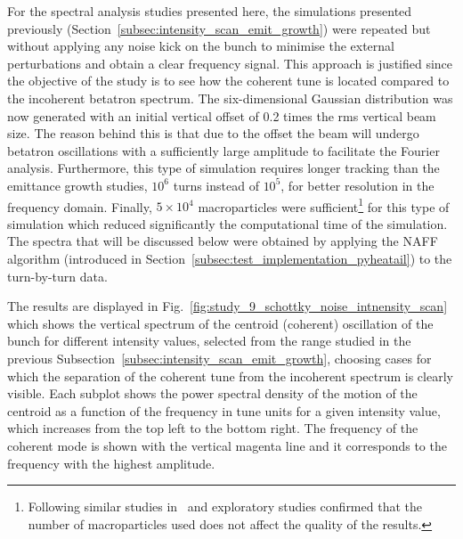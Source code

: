 For the spectral analysis studies presented here, the simulations presented previously (Section~\ref{subsec:intensity_scan_emit_growth}) were repeated but without applying any noise kick on the bunch to minimise the external perturbations and obtain a clear frequency signal. This approach is justified since the objective of the study is to see how the coherent tune is located compared to the incoherent betatron spectrum. The six-dimensional Gaussian distribution was now generated with an initial vertical offset of 0.2 times the rms vertical beam size. The reason behind this is that due to the offset the beam will undergo betatron oscillations with a sufficiently large amplitude to facilitate the Fourier analysis. Furthermore, this type of simulation requires longer tracking than the emittance growth studies, $10^6$ turns instead of $10^5$, for better resolution in the frequency domain. Finally, $5 \times 10^4$ macroparticles were sufficient\footnote{Following similar studies in~\cite{Zorzano-Mier:446334} and exploratory studies confirmed that the number of macroparticles used does not affect the quality of the results.} for this type of simulation which reduced significantly the computational time of the simulation. The spectra that will be discussed below were obtained by applying the NAFF algorithm (introduced in Section~\ref{subsec:test_implementation_pyheatail}) to the turn-by-turn data.%

The results are displayed in Fig.~\ref{fig:study_9_schottky_noise_intnensity_scan} which shows the vertical spectrum of the centroid (coherent) oscillation of the bunch for different intensity values, selected from the range studied in the previous Subsection~\ref{subsec:intensity_scan_emit_growth}, choosing cases for which the separation of the coherent tune from the incoherent spectrum is clearly visible. Each subplot shows the power spectral density of the motion of the centroid as a function of the frequency in tune units for a given intensity value, which increases from the top left to the bottom right. The frequency of the coherent mode is shown with the vertical magenta line and it corresponds to the frequency with the highest amplitude.

